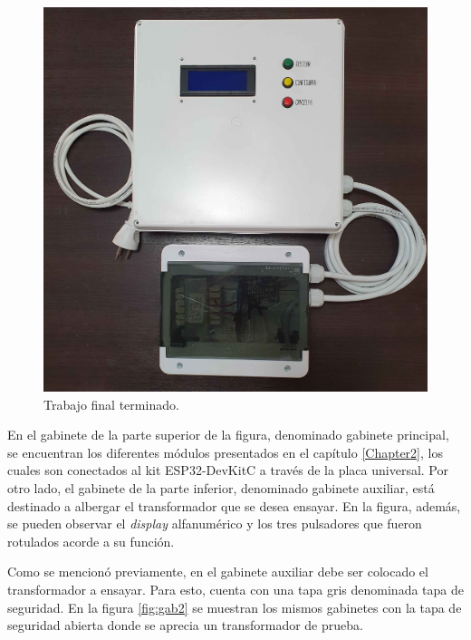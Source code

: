 \begin{figure}[htpb]
	\centering
	\includegraphics[scale=0.16]{./Figures/gab1.jpg}
	\caption{Trabajo final terminado.}
	\label{fig:gab1}
\end{figure}

En el gabinete de la parte superior de la figura, denominado gabinete principal, se encuentran los diferentes módulos presentados en el capítulo \ref{Chapter2}, los cuales son conectados al kit ESP32-DevKitC a través de la placa universal. Por otro lado, el gabinete de la parte inferior, denominado gabinete auxiliar, está destinado a albergar el transformador que se desea ensayar. En la figura, además, se pueden observar el \textit{display} alfanumérico y los tres pulsadores que fueron rotulados acorde a su función. 

Como se mencionó previamente, en el gabinete auxiliar debe ser colocado el transformador a ensayar. Para esto, cuenta con una tapa gris denominada tapa de seguridad. En la figura \ref{fig:gab2} se muestran los mismos gabinetes con la tapa de seguridad abierta donde se aprecia un transformador de prueba. 

